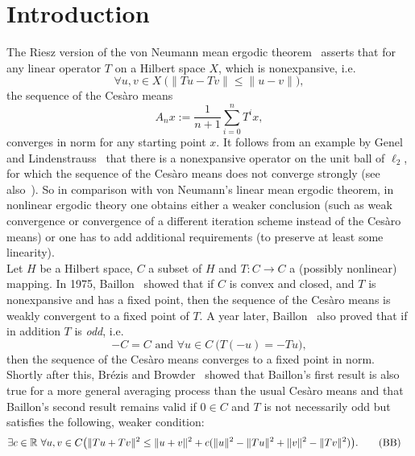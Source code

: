 \section{Introduction}


The Riesz version of the von Neumann mean ergodic theorem~\cite{Neumann1932} asserts that for any linear operator $T$ on a Hilbert space $X$, which is nonexpansive, i.e. 
\[
\forall u,v\in X\ \big(\|Tu-Tv\|\leq\|u-v\|\big),
\]
the sequence of the  Ces{\`a}ro means
\[
A_nx:=\frac{1}{n+1}\sum^{n}_{i=0} T^i x,
\]
converges in norm for any starting point $x$. 
It follows from an example 
by Genel and Lindenstrauss~\cite{Genel1975} that there is a nonexpansive operator on
the unit ball of $\ell_2$, for which the sequence of the  Ces{\`a}ro means does not converge strongly (see also~\cite{Krengel1985}).
So in comparison with von Neumann's linear mean ergodic theorem, in nonlinear ergodic theory 
one obtains either a weaker conclusion (such as weak convergence or convergence of a different
iteration scheme instead of the Ces{\`a}ro means) or one has to add additional requirements 
(to preserve at least some linearity).\\ 
Let $H$ be a Hilbert space, $C$ a subset of $H$ and
$T:C\to C$ a (possibly nonlinear) mapping. In 1975, Baillon~\cite{Baillon1975} showed  that if $C$ is convex and closed,
and $T$ is nonexpansive and has a fixed point, then the sequence of the Ces{\`a}ro means is weakly convergent to a fixed point of $T$.
A year later, Baillon~\cite{Baillon1976} also proved that if in addition $T$ is {\em odd}, i.e.
\[
-C = C\text{ and } \forall u\in C\ \big( T(-u)=-Tu\big),
\]
then the sequence of the Ces{\`a}ro means converges to a fixed point in norm. Shortly after this,
Br\'ezis and Browder~\cite{Brezis1976} showed that 
Baillon's first result is also true for a more general averaging process than the usual Ces{\`a}ro means
and that
Baillon's second
result remains valid if $0\in C$ and $T$ is not necessarily odd but satisfies the following, weaker condition:
\begin{align*}
\exists c&\in\mathbb{R}\ \forall u,v \in C 
 \big(\|Tu+Tv\|^2\leq\|u+v\|^2+c(\|u\|^2-\|Tu\|^2+\|v\|^2-\|Tv\|^2)\big). \tag{BB}\label{e:BB}
\end{align*}
